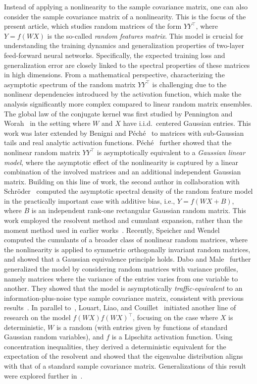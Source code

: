 Instead of applying a nonlinearity to the sample covariance matrix, one can also consider the sample covariance matrix of a nonlinearity. This is the focus of the present article, which studies random matrices of the form \(YY^\top\), where \(Y = f(WX)\) is the so-called \emph{random features matrix}. This model is crucial for understanding the training dynamics and generalization properties of two-layer feed-forward neural networks. Specifically, the expected training loss and generalization error are closely linked to the spectral properties of these matrices in high dimensions. From a mathematical perspective, characterizing the asymptotic spectrum of the random matrix \(YY^\top\) is challenging due to the nonlinear dependencies introduced by the activation function, which make the analysis significantly more complex compared to linear random matrix ensembles. The global law of the conjugate kernel was first studied by Pennington and Worah~\cite{pennington2017} in the setting where \(W\) and \(X\) have i.i.d.\ centered Gaussian entries. This work was later extended by Benigni and P\'{e}ch\'{e}~\cite{benigni2021} to matrices with sub-Gaussian tails and real analytic activation functions. P\'{e}ch\'{e}~\cite{peche2019} further showed that the nonlinear random matrix \(YY^\top\) is asymptotically equivalent to a \emph{Gaussian linear model}, where the asymptotic effect of the nonlinearity is captured by a linear combination of the involved matrices and an additional independent Gaussian matrix. Building on this line of work, the second author in collaboration with Schr\"{o}der~\cite{schroder2021} computed the asymptotic spectral density of the random feature model in the practically important case with additive bias, i.e., \(Y = f(WX+B)\), where \(B\) is an independent rank-one rectangular Gaussian random matrix. This work employed the resolvent method and cumulant expansion, rather than the moment method used in earlier works~\cite{pennington2017,benigni2021}. Recently, Speicher and Wendel~\cite{speicher2024} computed the cumulants of a broader class of nonlinear random matrices, where the nonlinearity is applied to symmetric orthogonally invariant random matrices, and showed that a Gaussian equivalence principle holds. Dabo and Male~\cite{dabo2024} further generalized the model by considering random matrices with variance profiles, namely matrices where the variance of the entries varies from one variable to another. They showed that the model is asymptotically \emph{traffic-equivalent} to an information-plus-noise type sample covariance matrix, consistent with previous results~\cite{peche2019}. In parallel to~\cite{pennington2017}, Louart, Liao, and Couillet~\cite{couillet2018} initiated another line of research on the model \(f(WX) f(WX)^\top\), focusing on the case where \(X\) is deterministic, \(W\) is a random (with entries given by functions of standard Gaussian random variables), and \(f \) is a Lipschitz activation function. Using concentration inequalities, they derived a deterministic equivalent for the expectation of the resolvent and showed that the eigenvalue distribution aligns with that of a standard sample covariance matrix. Generalizations of this result were explored further in~\cite{chouard2023}.


